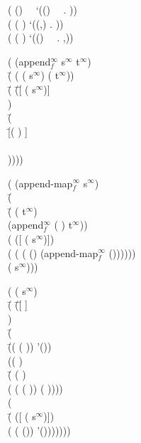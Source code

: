 \begin{ZZZZschemedisplay}%
( () \ \ `(() \ \ . ))\\%
( ( ) `((,) . ))\\%
( ( ) `(() \ \ . ,))
\end{ZZZZschemedisplay}

\begin{ZZZZschemedisplay}%
( (append$^\infty_f$ s$^\infty$ t$^\infty$)\\%
\PRN \HL \=( ( ( s$^\infty$) ( t$^\infty$))\\%
  \>\PRN \HL \=( \=(\=[ ( s$^\infty$)]\\%
  \>  \>     \> )\\%
  \>  \>\HL \HL \=(\\%
  \>  \>  \>\PRN \HL \=[( ) ]\\%
  \>  \>  \>  \>[(\va{not} \va{t2}) \va{t1}]\\%
  \>  \>  \>  ))))
\end{ZZZZschemedisplay}

\begin{ZZZZschemedisplay}%
( (append-map$^\infty_f$  s$^\infty$)\\%
\PRN \HL \=(\\%
  \>\PRN \HL \=( ( t$^\infty$)\\%
  \>  \>\PRN \HL (append$^\infty_f$ ( ) t$^\infty$))\\%
  \>  \>( ([ ( s$^\infty$)])\\%
  \>  \>\PRN \HL ( (  ( () (append-map$^\infty_f$  ())))))\\%
  \>  \>( s$^\infty$)))
\end{ZZZZschemedisplay}

\begin{ZZZZschemedisplay}%
( (  s$^\infty$)\\%
\PRN \HL \=(  \=(\=[ ]\\%
  \>          \> )\\%
  \>\HL \HL \=(\\%
  \>  \>\PRN \HL \=((  ( )) '())\\%
  \>  \>  \>(( )\\%
  \>  \>  \>\PRN \=( ( )\\%
  \>  \>  \> \>\PRN \HL ( (  ( )) ( ))))\\%
  \>  \>  \>(\\%
  \>  \>  \>\PRN \=( ([ ( s$^\infty$)])\\%
  \>  \>  \> \>\PRN \HL (  (  ()) '()))))))%
\end{ZZZZschemedisplay}
